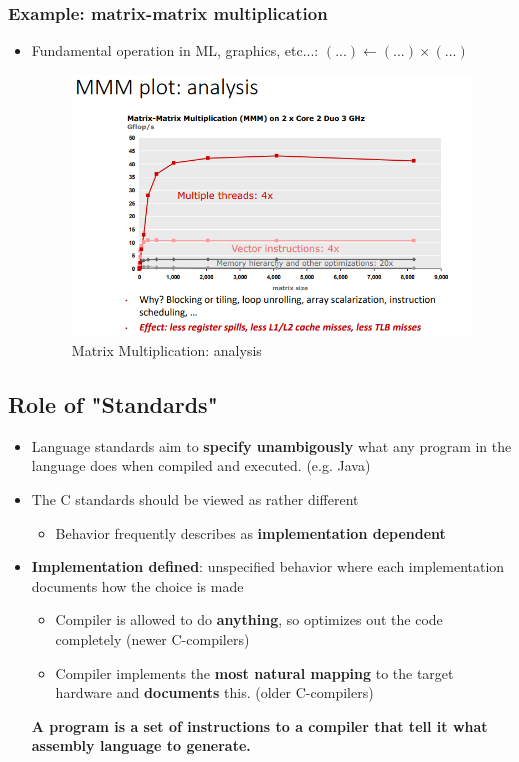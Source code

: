 \documentclass[a4paper,10pt]{article}
\begin{document}
\subsubsection{Example: matrix-matrix multiplication}
\begin{itemize}
    \item Fundamental operation in ML, graphics, etc...: $(...)\leftarrow(...)\times(...)$\\
    \begin{figure}[htp]
        \centering
        \includegraphics[width=11cm]{Pictures/e2.png}
        \caption{Matrix Multiplication: analysis}
        \label{fig:enter-label}
    \end{figure}
\end{itemize}
\subsection{Role of "Standards"}
\begin{itemize}
    \item Language standards aim to \textbf{specify unambigously} what any program
in the language does when compiled and executed. (e.g. Java)
    \item The C standards should be viewed as rather different
    \begin{itemize}
        \item Behavior frequently describes as \textbf{implementation dependent}
    \end{itemize}
    \item \textbf{Implementation defined}: unspecified behavior where each implementation documents how the choice is made
    \begin{itemize}
        \item Compiler is allowed to do \textbf{anything}, so optimizes out the code completely (newer C-compilers)
        \item Compiler implements the \textbf{most natural mapping} to the target hardware and \textbf{documents} this. (older C-compilers)
    \end{itemize}
    \textbf{A program is a set of instructions to a compiler that tell it what assembly language to generate.}
\end{itemize}
\end{document}

